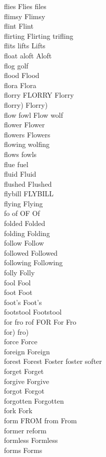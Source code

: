 flies Flies files\\
flimsy Flimsy\\
flint Flint\\
flirting Flirting trifling\\
flits lifts Lifts\\
float aloft Aloft\\
flog golf\\
flood Flood\\
flora Flora\\
florry FLORRY Florry\\
florry) Florry)\\
flow fowl Flow wolf\\
flower Flower\\
flowers Flowers\\
flowing wolfing\\
flows fowls\\
flue fuel\\
fluid Fluid\\
flushed Flushed\\
flybill FLYBILL\\
flying Flying\\
fo of OF Of\\
folded Folded\\
folding Folding\\
follow Follow\\
followed Followed\\
following Following\\
folly Folly\\
fool Fool\\
foot Foot\\
foot's Foot's\\
footstool Footstool\\
for fro rof FOR For Fro\\
for) fro)\\
force Force\\
foreign Foreign\\
forest Forest Foster foster softer\\
forget Forget\\
forgive Forgive\\
forgot Forgot\\
forgotten Forgotten\\
fork Fork\\
form FROM from From\\
former reform\\
formless Formless\\
forms Forms\\
